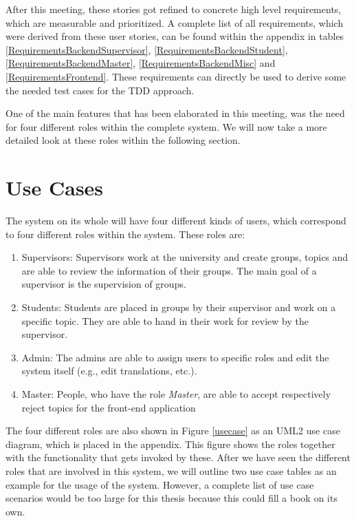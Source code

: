 After this meeting, these stories got refined to concrete high level requirements, which are measurable and prioritized. A complete list of all requirements, which were derived from these user stories, can be found within the appendix in tables \ref{RequirementsBackendSupervisor}, \ref{RequirementsBackendStudent}, \ref{RequirementsBackendMaster}, \ref{RequirementsBackendMisc} and \ref{RequirementsFrontend}. These requirements can directly be used to derive some the needed test cases for the \ac{TDD} approach.

One of the main features that has been elaborated in this meeting, was the need for four different roles within the complete system. We will now take a more detailed look at these roles within the following section.

\section{Use Cases}
The system on its whole will have four different kinds of users, which correspond to four different roles within the system. These roles are:

\begin{enumerate}
	\item Supervisors: Supervisors work at the university and create groups, topics and are able to review the information of their groups. The main goal of a supervisor is the supervision of groups.
	\item Students: Students are placed in groups by their supervisor and work on a specific topic. They are able to hand in their work for review by the supervisor. 
	\item Admin: The admins are able to assign users to specific roles and edit the system itself (e.g., edit translations, etc.).
	\item Master: People, who have the role \textit{Master}, are able to accept respectively reject topics for the front-end application
\end{enumerate}

The four different roles are also shown in Figure \ref{usecase} as an \ac{UML2} use case diagram, which is placed in the appendix. This figure shows the roles together with the functionality that gets invoked by these. 	
After we have seen the different roles that are involved in this system, we will outline two use case tables as an example for the usage of the system. However, a complete list of use case scenarios would be too large for this thesis because this could fill a book on its own.

